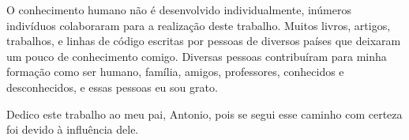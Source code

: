 \begin{agradecimentos}
	

    O conhecimento humano não é desenvolvido individualmente, inúmeros indivíduos colaboraram para a realização deste trabalho.
    Muitos livros, artigos, trabalhos, e linhas de código escritas por pessoas de diversos países que deixaram um pouco de conhecimento comigo.
    Diversas pessoas contribuíram para minha formação como ser humano, família, amigos, professores, conhecidos e desconhecidos, e essas pessoas eu sou grato.

    Dedico este trabalho ao meu pai, Antonio, pois se segui esse caminho com certeza foi devido à influência dele.

\end{agradecimentos}